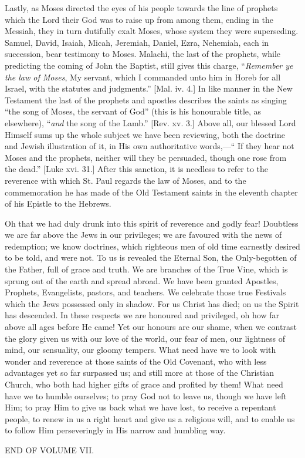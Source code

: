 Lastly, as Moses directed the eyes of his people towards the line
of prophets which the Lord their God was to raise up from among them,
ending in the Messiah, they in turn dutifully exalt Moses, whose
system they were superseding. Samuel, David, Isaiah, Micah, Jeremiah,
Daniel, Ezra, Nehemiah, each in succession, bear testimony to Moses.
Malachi, the last of the prophets, while predicting the coming of John
the Baptist, still gives this charge, ``\emph{Remember ye the law of
Moses}, My servant, which I commanded unto him in Horeb for all
Israel, with the statutes and judgments.'' [Mal. iv. 4.] In like
manner in the New Testament the last of the prophets and apostles
describes the saints as singing ``the song of Moses, the servant
of God'' (this is his honourable title, as elsewhere), ``\emph{and}
the song of the Lamb.'' [Rev. xv. 3.] Above all, our blessed Lord
Himself sums up the whole subject we have been reviewing, both the
doctrine and Jewish illustration of it, in His own authoritative
words,—`` If they hear not Moses and the prophets, neither will
they be persuaded, though one rose from the dead.'' [Luke xvi.
31.] After this sanction, it is needless to refer to the reverence
with which St. Paul regards the law of Moses, and to the commemoration
he has made of the Old Testament saints in the eleventh chapter of his
Epistle to the Hebrews.

Oh that we had duly drunk into this spirit of reverence and godly
fear! Doubtless we are far above the Jews in our privileges; we are
favoured with the news of redemption; we know doctrines, which
righteous men of old time earnestly desired to be told, and were not.
To us is revealed the Eternal Son, the Only-begotten of the Father,
full of grace and truth. We are branches of the True Vine, which is
sprung out of the earth and spread abroad. We have been granted
Apostles, Prophets, Evangelists, pastors, and teachers. We celebrate
those true Festivals which the Jews possessed only in shadow. For us
Christ has died; on us the Spirit has descended. In these respects we
are honoured and privileged, oh how far above all ages before He came!
Yet our honours are our shame, when we contrast the glory given us
with our love of the world, our fear of men, our lightness of mind,
our sensuality, our gloomy tempers. What need have we to look with
wonder and reverence at those saints of the Old Covenant, who with
less advantages yet so far surpassed us; and still more at those of
the Christian Church, who both had higher gifts of grace and profited
by them! What need have we to humble ourselves; to pray God not to
leave us, though we have left Him; to pray Him to give us back what we
have lost, to receive a repentant people, to renew in us a right heart
and give us a religious will, and to enable us to follow Him
perseveringly in His narrow and humbling way.

END OF VOLUME VII.
